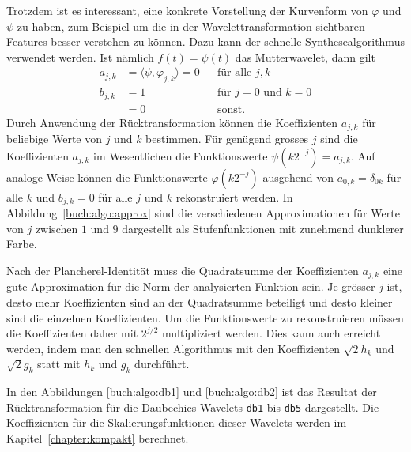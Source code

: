 Trotzdem ist es interessant, eine konkrete Vorstellung der Kurvenform
von $\varphi$ und $\psi$ zu haben, zum Beispiel um die in der
Wavelettransformation sichtbaren Features besser verstehen
zu können.
Dazu kann der schnelle Synthesealgorithmus verwendet werden.
Ist nämlich $f(t)=\psi(t)$ das Mutterwavelet, dann gilt
\[
\begin{aligned}
a_{j,k}
&=
\langle \psi, \varphi_{j,k}\rangle = 0 
& &\text{für alle $j,k$}
\\
b_{j,k}
&=1&&\text{für $j=0$ und $k=0$}
\\
&=0&&\text{sonst.}
\end{aligned}
\]
Durch Anwendung der Rücktransformation können die Koeffizienten 
$a_{j,k}$ für beliebige Werte von $j$ und $k$ bestimmen.
Für genügend grosses $j$ sind die Koeffizienten $a_{j,k}$ im Wesentlichen
die Funktionswerte $\psi(k2^{-j}) = a_{j,k}$.
Auf analoge Weise können die Funktionswerte $\varphi(k2^{-j})$
ausgehend von $a_{0,k}=\delta_{0k}$ für alle $k$
und $b_{j,k}=0$ für alle $j$ und $k$ rekonstruiert werden.
In Abbildung~\ref{buch:algo:approx} sind die verschiedenen Approximationen
für Werte von $j$ zwischen $1$ und $9$ dargestellt als Stufenfunktionen
mit zunehmend dunklerer Farbe.

Nach der Plancherel-Identität muss die Quadratsumme der Koeffizienten
$a_{j,k}$ eine gute Approximation für die Norm der analysierten Funktion
sein.
Je grösser $j$ ist, desto mehr Koeffizienten sind an der Quadratsumme
beteiligt und desto kleiner sind die einzelnen Koeffizienten.
Um die Funktionswerte zu rekonstruieren müssen die Koeffizienten
daher mit $2^{j/2}$ multipliziert werden.
Dies kann auch erreicht werden, indem man den schnellen Algorithmus
mit den Koeffizienten $\sqrt{2} h_k$ und
$\sqrt{2} g_k$ statt mit $h_k$ und $g_k$ durchführt.

In den Abbildungen \ref{buch:algo:db1} und \ref{buch:algo:db2}
ist das Resultat der Rücktransformation für die Daubechies-Wavelets
\texttt{db1} bis \texttt{db5} dargestellt.
Die Koeffizienten für die Skalierungsfunktionen dieser Wavelets werden
im Kapitel~\ref{chapter:kompakt} berechnet.

